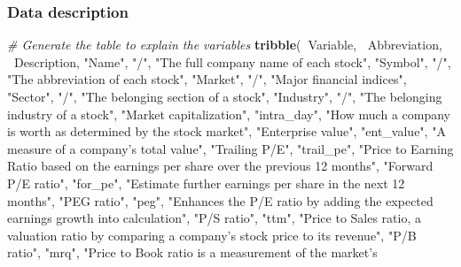 \documentclass[11pt,a4paper,]{article}
\newenvironment{Shaded}{\begin{snugshade}}{\end{snugshade}}
\newcommand{\CommentTok}[1]{\textcolor[rgb]{0.56,0.35,0.01}{\textit{#1}}}
\newcommand{\KeywordTok}[1]{\textcolor[rgb]{0.13,0.29,0.53}{\textbf{#1}}}
\newcommand{\NormalTok}[1]{#1}
\newcommand{\OperatorTok}[1]{\textcolor[rgb]{0.81,0.36,0.00}{\textbf{#1}}}
\newcommand{\StringTok}[1]{\textcolor[rgb]{0.31,0.60,0.02}{#1}}
\begin{document}
\hypertarget{data-description-1}{%
\subsubsection{Data description}\label{data-description-1}}

\begin{Shaded}
\begin{Highlighting}[]
\CommentTok{# Generate the table to explain the variables}
\KeywordTok{tribble}\NormalTok{(}\OperatorTok{~}\NormalTok{Variable, }\OperatorTok{~}\NormalTok{Abbreviation, }\OperatorTok{~}\NormalTok{Description,}
        \StringTok{"Name"}\NormalTok{, }\StringTok{"/"}\NormalTok{, }\StringTok{"The full company name of each stock"}\NormalTok{,}
        \StringTok{"Symbol"}\NormalTok{, }\StringTok{"/"}\NormalTok{, }\StringTok{"The abbreviation of each stock"}\NormalTok{,}
        \StringTok{"Market"}\NormalTok{, }\StringTok{"/"}\NormalTok{, }\StringTok{"Major financial indices"}\NormalTok{,}
        \StringTok{"Sector"}\NormalTok{, }\StringTok{"/"}\NormalTok{, }\StringTok{"The belonging section of a stock"}\NormalTok{,}
        \StringTok{"Industry"}\NormalTok{, }\StringTok{"/"}\NormalTok{, }\StringTok{"The belonging industry of a stock"}\NormalTok{,}
        \StringTok{"Market capitalization"}\NormalTok{, }\StringTok{"intra_day"}\NormalTok{, }\StringTok{"How much a company is worth as }
\StringTok{        determined by the stock market"}\NormalTok{, }
        \StringTok{"Enterprise value"}\NormalTok{, }\StringTok{"ent_value"}\NormalTok{, }\StringTok{"A measure of a company's total value"}\NormalTok{, }
        \StringTok{"Trailing P/E"}\NormalTok{, }\StringTok{"trail_pe"}\NormalTok{,  }\StringTok{"Price to Earning Ratio based on the earnings }
\StringTok{        per share over the previous 12 months"}\NormalTok{,}
        \StringTok{"Forward P/E ratio"}\NormalTok{, }\StringTok{"for_pe"}\NormalTok{,  }\StringTok{"Estimate further earnings per share in }
\StringTok{        the next 12 months"}\NormalTok{, }
        \StringTok{"PEG ratio"}\NormalTok{, }\StringTok{"peg"}\NormalTok{, }\StringTok{"Enhances the P/E ratio by adding the expected }
\StringTok{        earnings growth into calculation"}\NormalTok{, }
        \StringTok{"P/S ratio"}\NormalTok{, }\StringTok{"ttm"}\NormalTok{, }\StringTok{"Price to Sales ratio, a valuation ratio by comparing a }
\StringTok{        company’s stock price to its revenue"}\NormalTok{, }
        \StringTok{"P/B ratio"}\NormalTok{,  }\StringTok{"mrq"}\NormalTok{, }\StringTok{"Price to Book ratio is a measurement of the market's }

\end{Highlighting}
\end{Shaded}
\end{document}
